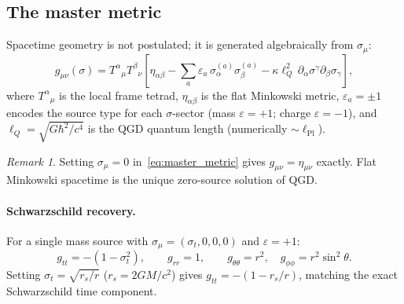 \documentclass[11pt,a4paper]{article}
\theoremstyle{plain}
\theoremstyle{definition}
\theoremstyle{remark}
\newtheorem{remark}[theorem]{Remark}
\newcommand{\sigt}{\sigma_t}
\newcommand{\rs}{r_s}
\newcommand{\lQ}{\ell_Q}
\begin{document}
\subsection{The master metric}

Spacetime geometry is not postulated; it is generated algebraically from $\sigma_\mu$:
\begin{equation}
  g_{\mu\nu}(\sigma) = T^\alpha{}_\mu T^\beta{}_\nu
  \!\left[\eta_{\alpha\beta}
        - \sum_a\varepsilon_a\,\sigma_\alpha^{(a)}\sigma_\beta^{(a)}
        - \kappa\lQ^2\,\partial_\alpha\sigma^\gamma\partial_\beta\sigma_\gamma
  \right],
  \label{eq:master_metric}
\end{equation}
where $T^\alpha{}_\mu$ is the local frame tetrad, $\eta_{\alpha\beta}$ is the flat
Minkowski metric, $\varepsilon_a = \pm 1$ encodes the source type for each $\sigma$-sector
(mass $\varepsilon = +1$; charge $\varepsilon = -1$), and $\lQ = \sqrt{G\hbar^2/c^4}$
is the QGD quantum length (numerically $\sim\ell_{\mathrm{Pl}}$).

\begin{remark}
Setting $\sigma_\mu = 0$ in~\eqref{eq:master_metric} gives $g_{\mu\nu} = \eta_{\mu\nu}$
exactly.  Flat Minkowski spacetime is the unique zero-source solution of QGD.
\end{remark}

\paragraph{Schwarzschild recovery.}
For a single mass source with $\sigma_\mu = (\sigt,0,0,0)$ and $\varepsilon = +1$:
\begin{equation}
  g_{tt} = -(1 - \sigt^2), \qquad g_{rr} = 1,
  \qquad g_{\theta\theta} = r^2,\quad g_{\phi\phi} = r^2\sin^2\theta.
\end{equation}
Setting $\sigt = \sqrt{\rs/r}$ ($\rs = 2GM/c^2$) gives $g_{tt} = -(1-\rs/r)$,
matching the exact Schwarzschild time component.
\end{document}
